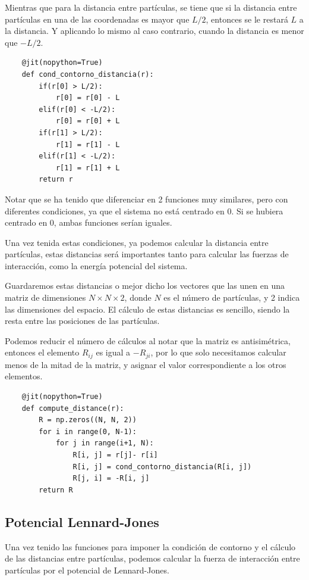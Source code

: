\documentclass[11pt, twoside]{article} %
\begin{document}
Mientras que para la distancia entre partículas, se tiene que si la distancia entre
partículas en una de las coordenadas es mayor que $L/2$, entonces se le restará 
$L$ a la distancia. Y aplicando lo mismo al caso contrario, cuando la distancia es
menor que $-L/2$.

\begin{verbatim}
    @jit(nopython=True)
    def cond_contorno_distancia(r):
        if(r[0] > L/2):
            r[0] = r[0] - L
        elif(r[0] < -L/2):
            r[0] = r[0] + L
        if(r[1] > L/2):
            r[1] = r[1] - L
        elif(r[1] < -L/2):
            r[1] = r[1] + L
        return r
\end{verbatim}

Notar que se ha tenido que diferenciar en 2 funciones muy similares, pero con diferentes
condiciones, ya que el sistema no está centrado en 0. Si se hubiera centrado en 0, 
ambas funciones serían iguales.

Una vez tenida estas condiciones, ya podemos calcular la distancia entre partículas,
estas distancias será importantes tanto para calcular las fuerzas de interacción, como 
la energía potencial del sistema. 

Guardaremos estas distancias o mejor dicho los vectores que las unen en una matriz 
de dimensiones $N\times N\times 2$, donde $N$ es el número de partículas, y 2 indica
las dimensiones del espacio. El cálculo de estas distancias es sencillo, siendo la
resta entre las posiciones de las partículas. 

Podemos reducir el número de cálculos al notar que la matriz es antisimétrica, entonces el 
elemento $R_{ij}$ es igual a $-R_{ji}$, por lo que solo necesitamos calcular menos de 
la mitad de la matriz, y asignar el valor correspondiente a los otros elementos.

\begin{verbatim}
    @jit(nopython=True)
    def compute_distance(r):
        R = np.zeros((N, N, 2))
        for i in range(0, N-1):
            for j in range(i+1, N):
                R[i, j] = r[j]- r[i]
                R[i, j] = cond_contorno_distancia(R[i, j])
                R[j, i] = -R[i, j]
        return R
\end{verbatim}

\subsection{Potencial Lennard-Jones}

Una vez tenido las funciones para imponer la condición de contorno y el cálculo de 
las distancias entre partículas, podemos calcular la fuerza de interacción entre 
partículas por el potencial de Lennard-Jones.
\end{document}
